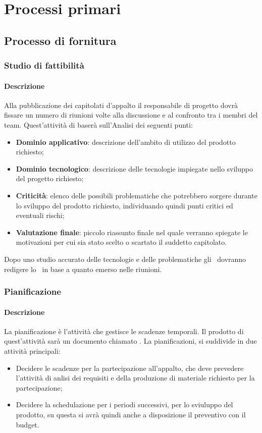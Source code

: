 \documentclass[../NormeDiProgetto_v4.0.0.tex]{subfiles}
\begin{document}
\section{Processi primari}
	\subsection{Processo di fornitura}
		\subsubsection{Studio di fattibilità}
			\paragraph{Descrizione}
				Alla pubblicazione dei capitolati d'appalto il responsabile di progetto dovrà fissare un numero di riunioni volte alla discussione e al confronto tra i membri del team.
				Quest'attività di baserà sull'Analisi dei seguenti punti:
				\begin{itemize}
					\item \textbf{Dominio applicativo}: descrizione dell'ambito di utilizzo del prodotto richiesto;
					\item \textbf{Dominio tecnologico}: descrizione delle tecnologie impiegate nello sviluppo del progetto richiesto;
					\item \textbf{Criticità}: elenco delle possibili problematiche che potrebbero sorgere durante lo sviluppo del prodotto richiesto, individuando quindi punti critici ed eventuali rischi;
					\item \textbf{Valutazione finale}: piccolo riassunto finale nel quale verranno spiegate le motivazioni per cui sia stato scelto o scartato il suddetto capitolato.
				\end{itemize}
				Dopo uno studio accurato delle tecnologie e delle problematiche gli \analisti\ dovranno redigere lo \studiodifattibilitav\ in base a quanto emerso nelle riunioni. 

		\subsubsection{Pianificazione}
			\paragraph{Descrizione}
				La pianificazione è l'attività che gestisce le scadenze temporali. Il prodotto di quest'attività sarà un documento chiamato \pianodiprogetto.
				La pianificazioni, si suddivide in due attività principali:
				\begin{itemize}
					\item Decidere le scadenze per la partecipazione all'appalto, che deve prevedere l'attività di anlisi dei requisiti e della produzione di materiale richiesto per la partecipazione;
					\item Decidere la schedulazione per i periodi successivi, per lo sviuluppo del prodotto, su questa si avrà quindi anche a disposizione il preventivo con il budget.
				\end{itemize}
\end{document}
